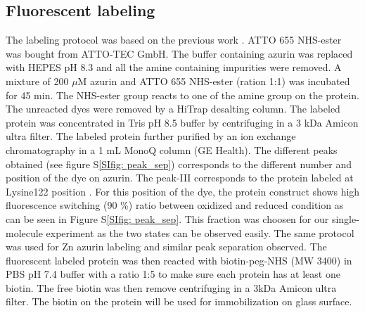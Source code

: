 \documentclass[journal=jacsat,manuscript=article]{achemso}
\begin{document}
\subsection{Fluorescent labeling}
The labeling protocol was based on the previous work \cite{nicolardi2012topdown}. ATTO 655 NHS-ester was bought from ATTO-TEC GmbH. The buffer containing azurin was replaced with HEPES pH 8.3 and all the amine containing impurities were removed. A mixture of 200 $\mu$M azurin and ATTO 655 NHS-ester (ration 1:1) was incubated for 45 min. The NHS-ester group reacts to one of the amine group on the protein. The unreacted dyes were removed by a HiTrap desalting column. The labeled protein was concentrated in Tris pH 8.5 buffer by centrifuging in a 3 kDa Amicon ultra filter. The labeled protein further purified by an ion exchange chromatography in a 1 mL MonoQ column (GE Health). The different peaks obtained (see figure S\ref{SIfig: peak_sep}) corresponds to the different number and position of the dye on azurin. The peak-III corresponds to the protein labeled at Lysine122 position \cite{nicolardi2012topdown}. For this position of the dye, the protein construct shows high fluorescence switching (90 \%) ratio between oxidized and reduced condition as can be seen in Figure S\ref{SIfig: peak_sep}. This fraction was choosen for our single-molecule experiment as the two states can be observed easily. The same protocol was used for Zn azurin labeling and similar peak separation observed. The fluorescent labeled protein was then reacted with biotin-peg-NHS (MW 3400) in PBS pH 7.4 buffer with a ratio 1:5 to make sure each protein has at least one biotin. The free biotin was then remove centrifuging in a 3kDa Amicon ultra filter. The biotin on the protein will be used for immobilization on glass surface.
\end{document}
